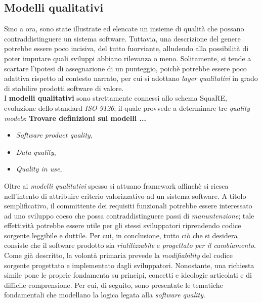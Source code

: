\documentclass{article}
\begin{document}
\subsection*{Modelli qualitativi}
\large
Sino a ora, sono state illustrate ed elencate un insieme di qualità che possano contraddistinguere un sistema software. Tuttavia, una descrizione del genere potrebbe essere poco incisiva, del tutto fuorviante, alludendo alla possibilità di poter imputare quali sviluppi abbiano rilevanza o meno. Solitamente, si tende a scartare l'ipotesi di assegnazione di un punteggio, poichè potrebbe essere poco adattiva rispetto al contesto narrato, per cui si adottano \textit{layer qualitativi} in grado di stabilire prodotti software di valore.\vspace*{14pt}\\
I \textbf{modelli qualitativi} sono strettamente connessi allo schema SquaRE, evoluzione dello standard \textit{ISO 9126}, il quale provvede a determinare tre \textit{quality models}: \textbf{Trovare definizioni sui modelli ...}
\begin{itemize}[label={-}]
    \itemsep0em
    \item \textit{Software product quality}, 
    \item \textit{Data quality},
    \item \textit{Quality in use},
\end{itemize} 
Oltre ai \textit{modelli qualitativi} spesso si attuano framework affinchè si riesca nell'intento di attribuire criterio valorizzativo ad un sistema software. A titolo semplificativo, il committente dei requisiti funzionali potrebbe essere interessato ad uno sviluppo coeso che possa contraddistinguere passi di \textit{manuntenzione}; tale effettività potrebbe essere utile per gli stessi sviluppatori riprendendo codice sorgente leggibile e duttile. Per cui, in conclusione, tutto ciò che si desidera consiste che il software prodotto sia \textit{riutilizzabile} e \textit{progettato per il cambiamento}.\vspace*{14pt}\\
Come già descritto, la volontà primaria prevede la \textit{modifiability} del codice sorgente progettato e implementato dagli sviluppatori. Nonostante, una richiesta simile pone le proprie fondamenta su principi, concetti e ideologie articolati e di difficile comprensione. Per cui, di seguito, sono presentate le tematiche fondamentali che modellano la logica legata alla \textit{software quality}.
\end{document}
